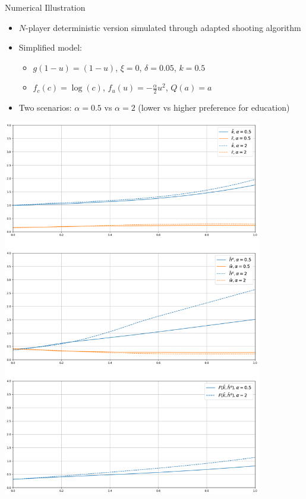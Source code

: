 \documentclass[xcolor=dvipsnames,t,aspectratio=170]{beamer} %
\begin{document}
\begin{frame}{Numerical Illustration}
\begin{itemize}
    \item $N$-player deterministic version simulated through adapted shooting algorithm
    \item Simplified model:
    \begin{itemize}
        \item $g(1- u) = (1 - u)$, $\xi = 0$, $\delta = 0.05$, $k = 0.5$
        \item $f_c(c) = \log(c)$, $f_u(u) = -\frac{\alpha}{2} u^2$, $Q(a) = a$
    \end{itemize}
    \item Two scenarios: $\alpha = 0.5$ vs $\alpha = 2$ (lower vs higher preference for education)
\end{itemize}

\includegraphics[width=0.85\textwidth]{../qualificacao/model_proposal/simulations/simulations_mfg.png}
\end{frame}
\end{document}

